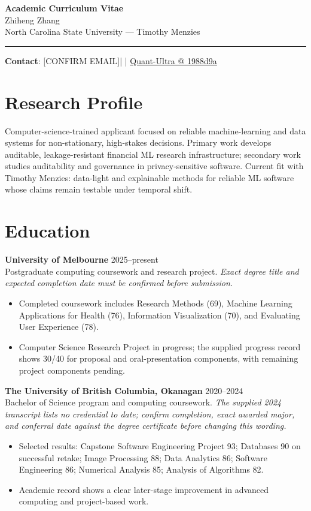 \documentclass[11pt]{article}
\makeatletter
\newcommand{\ApplicantName}{Zhiheng Zhang}
\newcommand{\ApplicantEmail}{[CONFIRM EMAIL]}
\newcommand{\ApplicantPhone}{[CONFIRM PHONE]}
\newcommand{\ApplicantGitHub}{\href{https://github.com/zhiheng-zhang-Mera/Quant-Ultra/tree/1988d9a8530da91a8158de864d098ea869098923}{Quant-Ultra @ 1988d9a}}
\makeatother
\begin{document}
\begin{center}
{\LARGE\bfseries Academic Curriculum Vitae}\\[0.25em]
{\large \ApplicantName}\\
North Carolina State University --- Timothy Menzies
\end{center}
\vspace{0.35em}\hrule\vspace{0.65em}

\textbf{Contact}: \ApplicantEmail\quad | \quad \ApplicantPhone\quad | \quad \ApplicantGitHub

\section*{Research Profile}
Computer-science-trained applicant focused on reliable machine-learning and data systems for non-stationary, high-stakes decisions. Primary work develops auditable, leakage-resistant financial ML research infrastructure; secondary work studies auditability and governance in privacy-sensitive software. Current fit with Timothy Menzies: data-light and explainable methods for reliable ML software whose claims remain testable under temporal shift.

\section*{Education}
\textbf{University of Melbourne} \hfill 2025--present\\
Postgraduate computing coursework and research project. \textit{Exact degree title and expected completion date must be confirmed before submission.}
\begin{itemize}
\item Completed coursework includes Research Methods (69), Machine Learning Applications for Health (76), Information Visualization (70), and Evaluating User Experience (78).
\item Computer Science Research Project in progress; the supplied progress record shows 30/40 for proposal and oral-presentation components, with remaining project components pending.
\end{itemize}

\textbf{The University of British Columbia, Okanagan} \hfill 2020--2024\\
Bachelor of Science program and computing coursework. \textit{The supplied 2024 transcript lists no credential to date; confirm completion, exact awarded major, and conferral date against the degree certificate before changing this wording.}
\begin{itemize}
\item Selected results: Capstone Software Engineering Project 93; Databases 90 on successful retake; Image Processing 88; Data Analytics 86; Software Engineering 86; Numerical Analysis 85; Analysis of Algorithms 82.
\item Academic record shows a clear later-stage improvement in advanced computing and project-based work.
\end{itemize}
\end{document}
